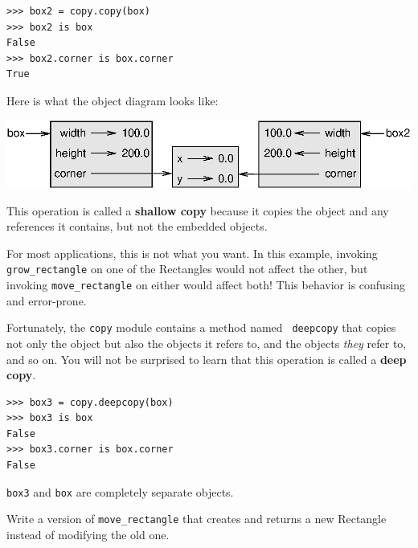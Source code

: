 \documentclass[10pt]{book}
\begin{document}

\beforeverb
\begin{verbatim}
>>> box2 = copy.copy(box)
>>> box2 is box
False
>>> box2.corner is box.corner
True
\end{verbatim}
\afterverb
%
Here is what the object diagram looks like:


\vspace{0.1in}
\beforefig
\centerline{\includegraphics{figs/rectangle2.eps}}
\afterfig
\vspace{0.1in}

This operation is called a {\bf shallow copy} because it copies the
object and any references it contains, but not the embedded objects.


For most applications, this is not what you want.  In this example,
invoking \verb"grow_rectangle" on one of the Rectangles would not
affect the other, but invoking \verb"move_rectangle" on either would
affect both!  This behavior is confusing and error-prone.


Fortunately, the {\tt copy} module contains a method named {\tt
deepcopy} that copies not only the object but also 
the objects it refers to, and the objects {\em they} refer to,
and so on.
You will not be surprised to learn that this operation is
called a {\bf deep copy}.


\beforeverb
\begin{verbatim}
>>> box3 = copy.deepcopy(box)
>>> box3 is box
False
>>> box3.corner is box.corner
False
\end{verbatim}
\afterverb
%
{\tt box3} and {\tt box} are completely separate objects.


\begin{ex}
Write a version of \verb"move_rectangle" that creates and
returns a new Rectangle instead of modifying the old one.
\end{ex}
\end{document}
